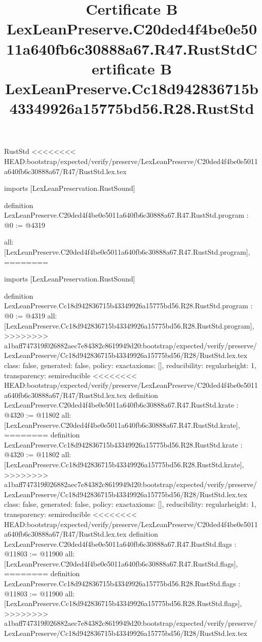 \begin{lexlean}{RustStd}
<<<<<<<< HEAD:bootstrap/expected/verify/preserve/LexLeanPreserve/C20ded4f4be0e5011a640fb6c30888a67/R47/RustStd.lex.tex
\title{Certificate B LexLeanPreserve.C20ded4f4be0e5011a640fb6c30888a67.R47.RustStd}
\begin{coremodule}
imports [LexLeanPreservation.RustSound]

definition LexLeanPreserve.C20ded4f4be0e5011a640fb6c30888a67.R47.RustStd.program : @0 := @4319 {
  all: [LexLeanPreserve.C20ded4f4be0e5011a640fb6c30888a67.R47.RustStd.program],
========
\title{Certificate B LexLeanPreserve.Cc18d942836715b43349926a15775bd56.R28.RustStd}
\begin{coremodule}
imports [LexLeanPreservation.RustSound]

definition LexLeanPreserve.Cc18d942836715b43349926a15775bd56.R28.RustStd.program : @0 := @4319 {
  all: [LexLeanPreserve.Cc18d942836715b43349926a15775bd56.R28.RustStd.program],
>>>>>>>> a1baff747319f026882aec7e84382c8619949d20:bootstrap/expected/verify/preserve/LexLeanPreserve/Cc18d942836715b43349926a15775bd56/R28/RustStd.lex.tex
  class: false,
  generated: false,
  policy: exact{axioms: []},
  reducibility: regular{height: 1},
  transparency: semireducible
}
<<<<<<<< HEAD:bootstrap/expected/verify/preserve/LexLeanPreserve/C20ded4f4be0e5011a640fb6c30888a67/R47/RustStd.lex.tex
definition LexLeanPreserve.C20ded4f4be0e5011a640fb6c30888a67.R47.RustStd.krate : @4320 := @11802 {
  all: [LexLeanPreserve.C20ded4f4be0e5011a640fb6c30888a67.R47.RustStd.krate],
========
definition LexLeanPreserve.Cc18d942836715b43349926a15775bd56.R28.RustStd.krate : @4320 := @11802 {
  all: [LexLeanPreserve.Cc18d942836715b43349926a15775bd56.R28.RustStd.krate],
>>>>>>>> a1baff747319f026882aec7e84382c8619949d20:bootstrap/expected/verify/preserve/LexLeanPreserve/Cc18d942836715b43349926a15775bd56/R28/RustStd.lex.tex
  class: false,
  generated: false,
  policy: exact{axioms: []},
  reducibility: regular{height: 1},
  transparency: semireducible
}
<<<<<<<< HEAD:bootstrap/expected/verify/preserve/LexLeanPreserve/C20ded4f4be0e5011a640fb6c30888a67/R47/RustStd.lex.tex
definition LexLeanPreserve.C20ded4f4be0e5011a640fb6c30888a67.R47.RustStd.flags : @11803 := @11900 {
  all: [LexLeanPreserve.C20ded4f4be0e5011a640fb6c30888a67.R47.RustStd.flags],
========
definition LexLeanPreserve.Cc18d942836715b43349926a15775bd56.R28.RustStd.flags : @11803 := @11900 {
  all: [LexLeanPreserve.Cc18d942836715b43349926a15775bd56.R28.RustStd.flags],
>>>>>>>> a1baff747319f026882aec7e84382c8619949d20:bootstrap/expected/verify/preserve/LexLeanPreserve/Cc18d942836715b43349926a15775bd56/R28/RustStd.lex.tex
}}}
\end{coremodule}}
\end{coremodule}
\end{lexlean}
